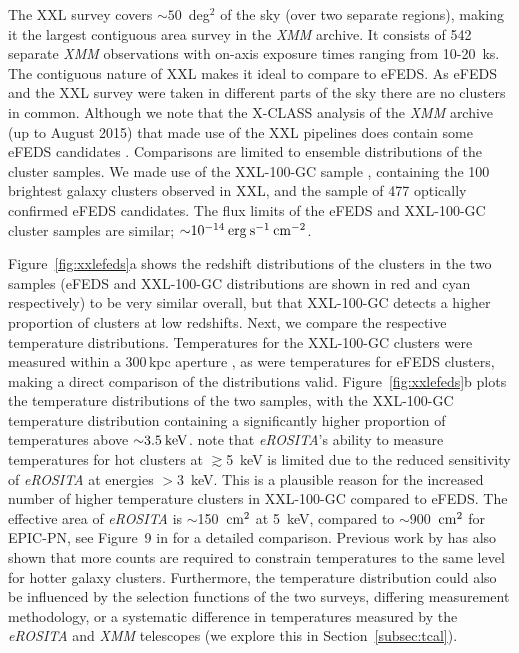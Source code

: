 \documentclass[fleqn,usenatbib]{mnras}
\begin{document}
The XXL survey \citep{xxlfoundation} covers ${\sim}50$~deg$^2$ of the sky (over two separate regions), making it the largest contiguous area survey in the {\em XMM} archive. It consists of 542 separate {\em XMM} observations with on-axis exposure times ranging from 10-20~ks. The contiguous nature of XXL makes it ideal to compare to eFEDS. As eFEDS and the XXL survey were taken in different parts of the sky there are no clusters in common. Although we note that the X-CLASS analysis of the {\em XMM} archive (up to August 2015) that made use of the XXL pipelines does contain some eFEDS candidates \citep[][]{xclass}. Comparisons are limited to ensemble distributions of the cluster samples.  We made use of the XXL-100-GC sample \citep{xxlgc100}, containing the 100 brightest galaxy clusters observed in XXL, and the sample of 477 optically confirmed eFEDS candidates.  The flux limits of the eFEDS and XXL-100-GC cluster samples are similar; ${\sim}10^{-14}\:\rm{erg}\:\rm{s}^{-1}\:\rm{cm}^{-2}$.

Figure~\ref{fig:xxlefeds}a shows the redshift distributions of the clusters in the two samples (eFEDS and XXL-100-GC distributions are shown in red and cyan respectively) to be very similar overall, but that XXL-100-GC detects a higher proportion of clusters at low redshifts.  Next, we compare the respective temperature distributions. Temperatures for the XXL-100-GC clusters were measured within a 300\,kpc aperture \citep{xxllt}, as were temperatures for eFEDS clusters, making a direct comparison of the distributions valid. Figure~\ref{fig:xxlefeds}b plots the temperature distributions of the two samples, with the XXL-100-GC temperature distribution containing a significantly higher proportion of temperatures above ${\sim}3.5\:\rm{keV}$. \cite{efedsclustercat} note that {\em eROSITA}'s ability to measure temperatures for hot clusters at $\gtrsim$5~keV is limited due to the reduced sensitivity of {\em eROSITA} at energies $>$3~keV. This is a plausible reason for the increased number of higher temperature clusters in XXL-100-GC compared to eFEDS. The effective area of {\em eROSITA} is ${\sim}$150~$\rm{cm}^2$ at 5~keV, compared to ${\sim}$900~$\rm{cm}^2$ for EPIC-PN, see Figure~9 in \cite{missionpaper} for a detailed comparison. Previous work by \cite{xcsmethod} has also shown that more counts are required to constrain temperatures to the same level for hotter galaxy clusters. Furthermore, the temperature distribution could also be influenced by the selection functions of the two surveys, differing measurement methodology, or a systematic difference in temperatures measured by the {\em eROSITA} and {\em XMM} telescopes (we explore this in Section~\ref{subsec:tcal}). 
\end{document}
